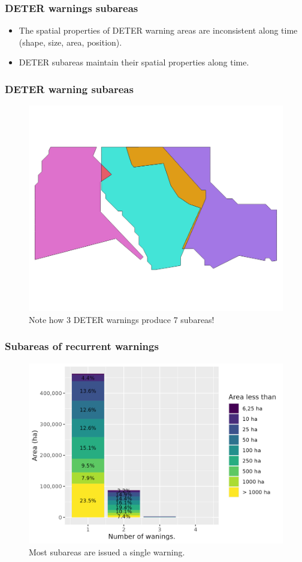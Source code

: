 \documentclass[aspectratio=169]{beamer}
\begin{document}
\begin{frame}
    \frametitle{DETER warnings subareas}
    \begin{itemize}
        \item The spatial properties of DETER warning areas are inconsistent 
            along time (shape, size, area, position).
        \item DETER subareas maintain their spatial properties along time.
    \end{itemize}
\end{frame}

\begin{frame}
    \frametitle{DETER warning subareas}
    \begin{figure}[h] 
        \includegraphics[width=0.60\linewidth]
        {./figures/sample_deter_subareas.png}
        \caption{Note how 3 DETER warnings produce 7 subareas!}
        \label{fig:deter_subareas}
    \end{figure}
\end{frame}

\begin{frame}
    \frametitle{Subareas of recurrent warnings}
    \begin{figure}[h] 
        \includegraphics[width=0.65\linewidth] 
        {./figures/plot_area_by_warnings.png}
        \caption{Most subareas are issued a single warning.}
        \label{fig:deter_warning_recurrency}
    \end{figure}
\end{frame}
\end{document}
